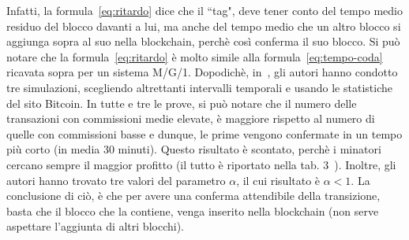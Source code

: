 Infatti, la formula~\eqref{eq:ritardo} dice che il ``tag", deve tener conto del tempo medio residuo del blocco davanti a lui, ma anche del tempo medio che un altro blocco si aggiunga sopra al suo nella blockchain, perch\`e così conferma il suo blocco.
Si può notare che la formula~\eqref{eq:ritardo} \`e molto simile alla formula~\eqref{eq:tempo-coda} ricavata sopra per un sistema M/G/1.
Dopodich\`e, in~\cite[sez. 5]{art2:MG1}, gli autori hanno condotto tre simulazioni, scegliendo altrettanti intervalli temporali e usando le statistiche del sito Bitcoin. In tutte e tre le prove, si può notare che il numero delle transazioni con commissioni medie elevate, \`e maggiore rispetto al numero di quelle con commissioni basse e dunque, le prime vengono confermate in un tempo più corto (in media 30 minuti). Questo risultato \`e scontato, perch\`e i minatori cercano sempre il maggior profitto (il tutto \`e riportato nella tab. 3~\cite[sottosez. 5.1]{art2:MG1}). Inoltre, gli autori hanno trovato tre valori del parametro $\alpha$, il cui risultato \`e $\alpha<1$. La conclusione di ciò, \`e che per avere una conferma attendibile della transizione, basta che il blocco che la contiene, venga inserito nella blockchain (non serve aspettare l'aggiunta di altri blocchi).

